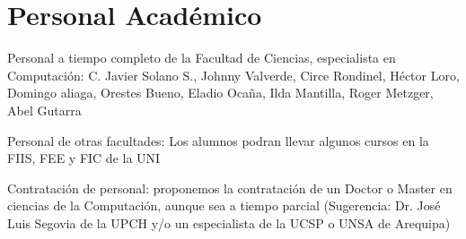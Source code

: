 \section{Personal Acad\'emico}\label{sec:cs-per-academico}

Personal a tiempo completo de la Facultad de Ciencias, especialista en Computaci\'on: C. Javier Solano S., Johnny Valverde, Circe Rondinel, H\'ector Loro, Domingo aliaga, Orestes Bueno, Eladio Oca\~na, Ilda Mantilla, Roger Metzger, Abel Gutarra

Personal de otras facultades: Los alumnos podran llevar algunos cursos en la FIIS, FEE y FIC de la UNI

Contrataci\'on de personal: proponemos la contrataci\'on de un Doctor o Master en ciencias de la Computaci\'on, aunque sea a tiempo parcial (Sugerencia: Dr. Jos\'e Luis Segovia de la UPCH y/o un especialista de la UCSP o UNSA de Arequipa)
